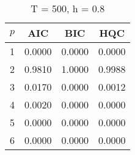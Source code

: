 \begin{table}[ht]
\captionsetup{justification=raggedright,singlelinecheck=false}
\caption*{T = 500, h = 0.8}
\begin{tabular}{c|ccc}
  $p$ & AIC & BIC & HQC \\\hline
  1 & 0.0000 & 0.0000 & 0.0000 \\
  2 & 0.9810 & 1.0000 & 0.9988 \\
  3 & 0.0170 & 0.0000 & 0.0012 \\
  4 & 0.0020 & 0.0000 & 0.0000 \\
  5 & 0.0000 & 0.0000 & 0.0000 \\
  6 & 0.0000 & 0.0000 & 0.0000 \\
\end{tabular}
\end{table}
